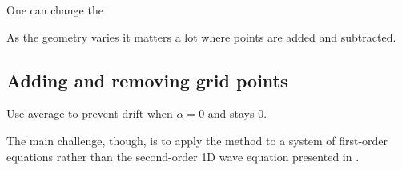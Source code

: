 One can change the 


As the geometry varies it matters a lot where points are added and subtracted. 


\subsection{Adding and removing grid points}
Use average to prevent drift when $\alpha = 0$ and stays 0.

The main challenge, though, is to apply the method to a system of first-order equations rather than the second-order 1D wave equation presented in \cite{Willemsen2021}. 